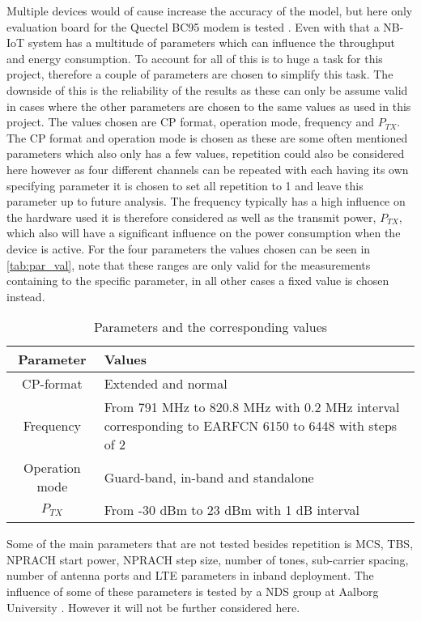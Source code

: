 Multiple devices would of cause increase the accuracy of the model, but here only evaluation board for the Quectel BC95 modem is tested \citep{BC95}. Even with that a \gls{NB-IoT} system has a multitude of parameters which can influence the throughput and energy consumption. To account for all of this is to huge a task for this project, therefore a couple of parameters are chosen to simplify this task. The downside of this is the reliability of the results as these can only be assume valid in cases where the other parameters are chosen to the same values as used in this project. The values chosen are CP format, operation mode, frequency and $P_{TX}$. The CP format and operation mode is chosen as these are some often mentioned parameters which also only has a few values, repetition could also be considered here however as four different channels can be repeated with each having its own specifying parameter it is chosen to set all repetition to 1 and leave this parameter up to future analysis. The frequency typically has a high influence on the hardware used it is therefore considered as well as the transmit power, $P_{TX}$, which also will have a significant influence on the power consumption when the device is active. For the four parameters the values chosen can be seen in \autoref{tab:par_val}, note that these ranges are only valid for the measurements containing to the specific parameter, in all other cases a fixed value is chosen instead.

\begin{table}[H]
\centering
\begin{tabular}{|c|p{8cm}|} \hline
\textbf{Parameter} & \textbf{Values} \\ \hline
CP-format & Extended and normal\\ \hline
Frequency & From 791 MHz to 820.8 MHz with 0.2 MHz interval corresponding to EARFCN 6150 to 6448 with steps of 2 \\ \hline
Operation mode & Guard-band, in-band and standalone \\ \hline
$P_{TX}$ & From -30 dBm to 23 dBm with 1 dB interval \\ \hline
\end{tabular}
\caption{Parameters and the corresponding values}
\label{tab:par_val}
\end{table}

Some of the main parameters that are not tested besides repetition is \gls{MCS}, \gls{TBS}, NPRACH start power, NPRACH step size, number of tones, sub-carrier spacing, number of antenna ports and LTE parameters in inband deployment. The influence of some of these parameters is tested by a NDS group at Aalborg University \citep{NDS_report}. However it will not be further considered here.

